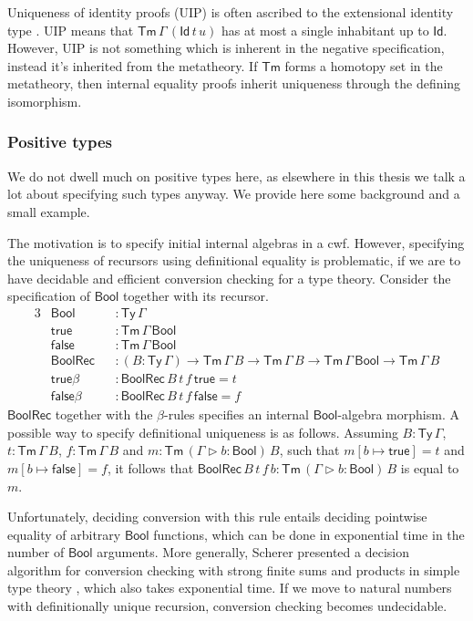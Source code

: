 \documentclass[12pt,a4paper,twoside,openany]{book}
\theoremstyle{remark}
\theoremstyle{definition}
\newcommand{\ms}[1]{\mathsf{#1}}
\newcommand{\Tm}{\mathsf{Tm}}
\newcommand{\Ty}{\mathsf{Ty}}
\newcommand{\Id}{\mathsf{Id}}
\newcommand{\ext}{\triangleright}
\newcommand{\Bool}{\ms{Bool}}
\newcommand{\true}{\ms{true}}
\newcommand{\false}{\ms{false}}
\begin{document}
Uniqueness of identity proofs (UIP) is often ascribed to the extensional
identity type \cite{TODO}. UIP means that $\Tm\,\Gamma\,(\Id\,t\,u)$ has at most
a single inhabitant up to $\Id$. However, UIP is not something which is inherent
in the negative specification, instead it's inherited from the metatheory. If
$\Tm$ forms a homotopy set in the metatheory, then internal equality proofs
inherit uniqueness through the defining isomorphism.

\subsubsection{Positive types}

We do not dwell much on positive types here, as elsewhere in this thesis we talk
a lot about specifying such types anyway. We provide here some background and
a small example.

The motivation is to specify initial internal algebras in a cwf. However,
specifying the uniqueness of recursors using definitional equality is
problematic, if we are to have decidable and efficient conversion checking for a
type theory. Consider the specification of $\Bool$ together with its recursor.
\begin{alignat*}{3}
  & \Bool  &&: \Ty\,\Gamma \\
  & \true  &&: \Tm\,\Gamma\,\Bool \\
  & \false &&: \Tm\,\Gamma\,\Bool \\
  & \ms{BoolRec} &&: (B : \Ty\,\Gamma)\to \Tm\,\Gamma\,B \to \Tm\,\Gamma\,B \to \Tm\,\Gamma\,\Bool \to \Tm\,\Gamma\,B\\
  & \true\beta &&: \ms{BoolRec}\,B\,t\,f\,\true = t\\
  & \false\beta &&: \ms{BoolRec}\,B\,t\,f\,\false = f
\end{alignat*}
$\ms{BoolRec}$ together with the $\beta$-rules specifies an internal
$\Bool$-algebra morphism. A possible way to specify definitional uniqueness is
as follows. Assuming $B : \Ty\,\Gamma$, $t : \Tm\,\Gamma\,B$, $f :
\Tm\,\Gamma\,B$ and $m : \Tm\,(\Gamma\ext b : \Bool)\,B$, such that $m[b \mapsto
  \true] = t$ and $m[b \mapsto \false] = f$, it follows that
$\ms{BoolRec}\,B\,t\,f\,b : \Tm\,(\Gamma\ext b : \Bool)\,B$ is equal to $m$.

Unfortunately, deciding conversion with this rule entails deciding pointwise
equality of arbitrary $\Bool$ functions, which can be done in exponential time
in the number of $\Bool$ arguments. More generally, Scherer presented a decision
algorithm for conversion checking with strong finite sums and products in simple
type theory \cite{scherer17deciding}, which also takes exponential time. If we
move to natural numbers with definitionally unique recursion, conversion
checking becomes undecidable.
\end{document}
